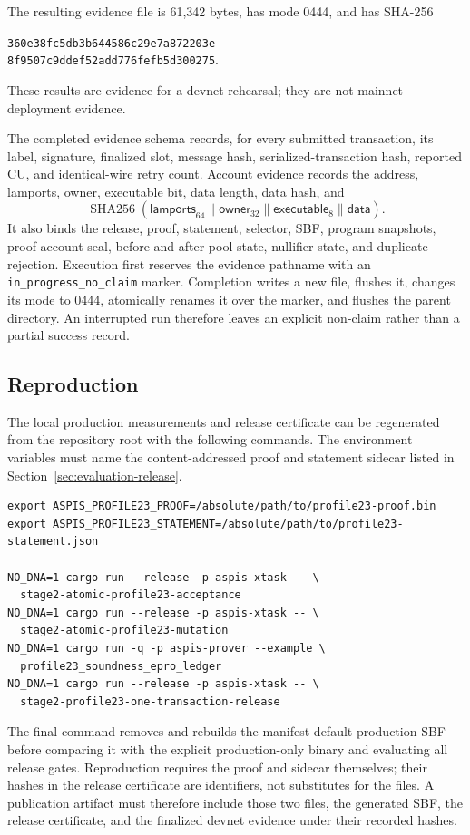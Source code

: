 The resulting evidence file is 61,342 bytes, has mode 0444, and has SHA-256
\begin{center}
  \texttt{360e38fc5db3b644586c29e7a872203e}\\
  \texttt{8f9507c9ddef52add776fefb5d300275}.
\end{center}
These results are evidence for a devnet rehearsal; they are not mainnet
deployment evidence.

The completed evidence schema records, for every submitted transaction, its
label, signature, finalized slot, message hash, serialized-transaction hash,
reported CU, and identical-wire retry count.  Account evidence records the
address, lamports, owner, executable bit, data length, data hash, and
\[
  \operatorname{SHA256}(
    \mathsf{lamports}_{64}\mathbin\|\mathsf{owner}_{32}
    \mathbin\|\mathsf{executable}_{8}\mathbin\|\mathsf{data}).
\]
It also binds the release, proof, statement, selector, SBF, program snapshots,
proof-account seal, before-and-after pool state, nullifier state, and duplicate
rejection.  Execution first reserves the evidence pathname with an
\texttt{in\_progress\_no\_claim} marker.  Completion writes a new file,
flushes it, changes its mode to 0444, atomically renames it over the marker,
and flushes the parent directory.  An interrupted run therefore leaves an
explicit non-claim rather than a partial success record.

\subsection{Reproduction}
\label{sec:evaluation-reproduction}

The local production measurements and release certificate can be regenerated
from the repository root with the following commands.  The environment
variables must name the content-addressed proof and statement sidecar listed
in Section~\ref{sec:evaluation-release}.

\begin{verbatim}
export ASPIS_PROFILE23_PROOF=/absolute/path/to/profile23-proof.bin
export ASPIS_PROFILE23_STATEMENT=/absolute/path/to/profile23-statement.json

NO_DNA=1 cargo run --release -p aspis-xtask -- \
  stage2-atomic-profile23-acceptance
NO_DNA=1 cargo run --release -p aspis-xtask -- \
  stage2-atomic-profile23-mutation
NO_DNA=1 cargo run -q -p aspis-prover --example \
  profile23_soundness_epro_ledger
NO_DNA=1 cargo run --release -p aspis-xtask -- \
  stage2-profile23-one-transaction-release
\end{verbatim}

The final command removes and rebuilds the manifest-default production SBF
before comparing it with the explicit production-only binary and evaluating
all release gates.  Reproduction requires the proof and sidecar themselves;
their hashes in the release certificate are identifiers, not substitutes for
the files.  A publication artifact must therefore include those two files,
the generated SBF, the release certificate, and the finalized devnet evidence
under their recorded hashes.
